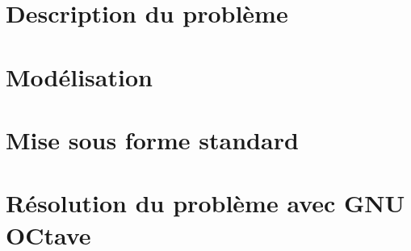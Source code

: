 \documentclass{article}
\begin{document}
\tableofcontents

\newpage

\section{Description du problème}



\section{Modélisation}



\section{Mise sous forme standard}



\section{Résolution du problème avec GNU OCtave}


\end{document}
